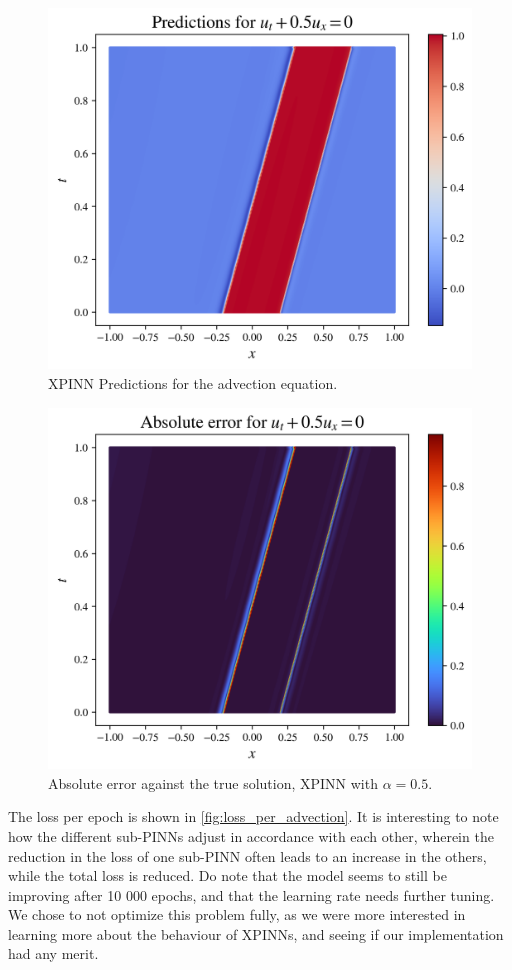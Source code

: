 \begin{figure}[h]
    \centering
    \includegraphics[width=0.8\linewidth]{Project1XPINNs/figures/advection/xpinn_predictions.png}
    \caption{XPINN Predictions for the advection equation.}\label{fig:advection_xpinn_pred}
\end{figure}

\begin{figure}[!h]
    \centering
    \includegraphics[width=0.8\linewidth]{Project1XPINNs/figures/advection/xpinn_error.png}
    \caption{Absolute error against the true solution, XPINN with $\alpha=0.5$.}\label{fig:advection_xpinn_error}
\end{figure}

The loss per epoch is shown in \autoref{fig:loss_per_advection}.
It is interesting to note how the different sub-PINNs adjust in accordance with each other, wherein the reduction in the loss of one sub-PINN often leads to an increase in the others, while the total loss is reduced.
Do note that the model seems to still be improving after 10 000 epochs, and that the learning rate needs further tuning.
We chose to not optimize this problem fully, as we were more interested in learning more about the behaviour of XPINNs, and seeing if our implementation had any merit.

